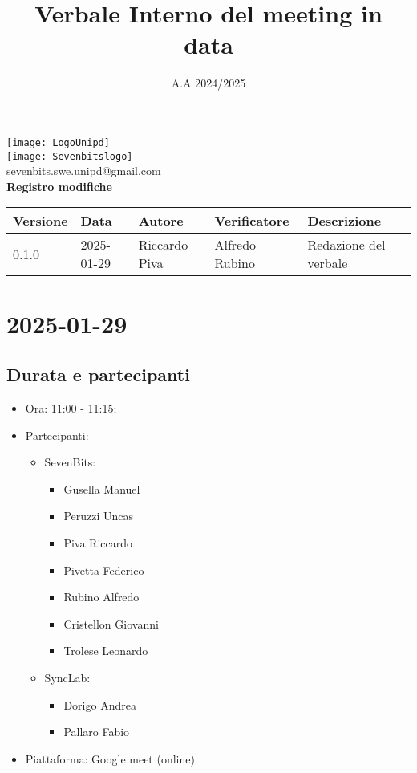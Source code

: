 \documentclass[10pt]{article}
\title{Verbale Interno del meeting in data}
\date{A.A 2024/2025}
\begin{document}
\maketitle
\begin{center}
\texttt{[image: LogoUnipd]}\\
\texttt{[image: Sevenbitslogo]}\\
sevenbits.swe.unipd@gmail.com\\
\vspace{2mm}
\textbf{Registro modifiche}\\
\vspace{2mm}
\begin{tabularx}{\textwidth}{|l|l|l|l|X|}
\hline
\textbf{Versione} & \textbf{Data} & \textbf{Autore} & \textbf{Verificatore} & \textbf{Descrizione} \\
\hline
0.1.0 & 2025-01-29 & Riccardo Piva & Alfredo Rubino & Redazione del verbale \\
\hline
\end{tabularx}
\end{center}
\newpage
\tableofcontents
\newpage
\section{2025-01-29}
\subsection{Durata e partecipanti}
\begin{itemize}
\item Ora: 11:00 - 11:15;
\item Partecipanti:
	\begin{itemize}
	\item 	SevenBits:
			\begin{itemize}
				\item Gusella Manuel
				\item Peruzzi Uncas
				\item Piva Riccardo
				\item Pivetta Federico
				\item Rubino Alfredo
				\item Cristellon Giovanni
				\item Trolese Leonardo
			\end{itemize}
	\item 	SyncLab:
			\begin{itemize}
				\item Dorigo Andrea
				\item Pallaro Fabio
			\end{itemize}
	\end{itemize}
\item Piattaforma: Google meet (online)
\end{itemize}
\end{document}

